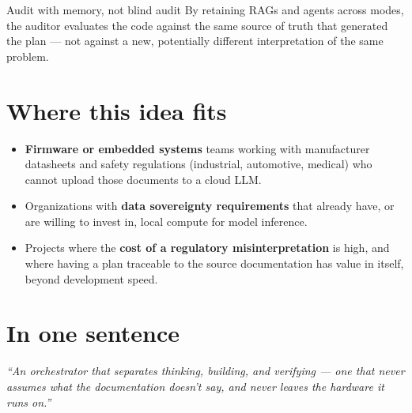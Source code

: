 \documentclass[11pt]{article}
\begin{document}
\vspace{0.4em}

\begin{ideabox}{Audit with memory, not blind audit}
By retaining RAGs and agents across modes, the auditor evaluates the code against the same source of truth that generated the plan --- not against a new, potentially different interpretation of the same problem.
\end{ideabox}

\section{Where this idea fits}

\begin{itemize}
  \item \textbf{Firmware or embedded systems} teams working with manufacturer datasheets and safety regulations (industrial, automotive, medical) who cannot upload those documents to a cloud LLM.
  \item Organizations with \textbf{data sovereignty requirements} that already have, or are willing to invest in, local compute for model inference.
  \item Projects where the \textbf{cost of a regulatory misinterpretation} is high, and where having a plan traceable to the source documentation has value in itself, beyond development speed.
\end{itemize}

\section{In one sentence}

\begin{center}
\begin{tcolorbox}[
  enhanced, colback=inkNavy, colframe=inkNavy,
  coltext=white, width=0.9\textwidth, halign=center,
  arc=3pt, boxrule=0pt
]
\large\itshape ``An orchestrator that separates thinking, building, and verifying --- one that never assumes what the documentation doesn't say, and never leaves the hardware it runs on.''
\end{tcolorbox}
\end{center}
\end{document}
